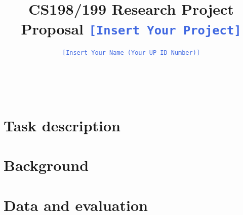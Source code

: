 \documentclass[11pt,A4]{article}
\newcommand{\blue}[1]{\textcolor{RoyalBlue}{#1}}
\newcommand{\fillme}[1]{\blue{\texttt{[Insert #1]}}}
\newcommand{\instructions}[1]{\blue{\textit{#1}}}
\renewcommand{\instructions}[1]{}
\begin{document}
\title{CS198/199 Research Project Proposal \fillme{Your Project}}
\author{\fillme{Your Name (Your UP ID Number)}}
\maketitle



\instructions{If you are taking CS 198/199 in Logic and Computability Lab, you need to
  either do at least a research project or a literature review.\\
This is a \LaTeX template for the initial proposal for the research project,  but should also give you a start on the final report.\\
The blue pieces of text  in this template are either instructions ({\tt$\backslash$instructions\{...\}}) or indicate where you need to fill in something ({\tt$\backslash$fillme\{...\}}).  
You should replace all the {\tt$\backslash$fillme\{...\}} commands with your own text.
To make the instructions disappear, please uncomment the 
\begin{center}
{\tt$\backslash$renewcommand\{$\backslash$instructions\}[1]\{\}}\\
\end{center}
lines in the preamble (just above  {\tt $\backslash$begin\{document\}} of this .tex file) by removing the leading \% marks, 
recompile (run \LaTeX again) and submit the PDF on Compass.}\\

\section*{Task description}
\instructions{Describe the task you want to tackle in your project.}

\section*{Background}
\instructions{What prior work has there been on or related to your task? Please
  provide bibliographic references where available}

\section*{Data and evaluation}
\instructions{Do you have data to train/develop and test your system on? How
  will you evaluate your system?}
\end{document}
